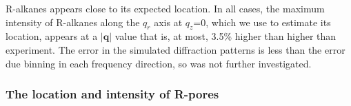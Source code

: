 \documentclass[journal=jpcbfk,manuscript=article]{achemso}
\begin{document}
  R-alkanes appears close to its expected location. In all cases, the maximum
  intensity of R-alkanes along the $q_r$ axis at $q_z$=0, which we use to
  estimate its location, appears at a $|\mathbf{q}|$ value that is, at most,
  3.5\% higher than higher than experiment. 
  The error in the simulated diffraction patterns is less than the error due
  binning in each frequency direction, so was not further investigated. 

  \subsubsection{The location and intensity of R-pores}\label{section:rpores}
  
\end{document}
